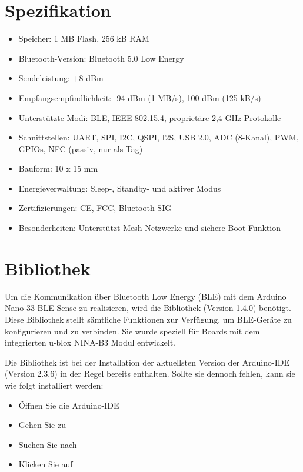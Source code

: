 \section{Spezifikation}
\begin{itemize}
	\item Speicher: 1 MB Flash, 256 kB RAM
	\item Bluetooth-Version: Bluetooth 5.0 Low Energy
	\item Sendeleistung: +8 dBm
	\item Empfangsempfindlichkeit: -94 dBm (1 MB/s), 100 dBm (125 kB/s)
	\item Unterstützte Modi: BLE, IEEE 802.15.4, proprietäre 2,4-GHz-Protokolle
	\item Schnittstellen: UART, SPI, I2C, QSPI, I2S, USB 2.0, ADC (8-Kanal), PWM, GPIOs, NFC (passiv, nur als Tag)
	\item Bauform: 10 x 15 mm 
	\item Energieverwaltung: Sleep-, Standby- und aktiver Modus
	\item Zertifizierungen: CE, FCC, Bluetooth SIG
	\item Besonderheiten: Unterstützt Mesh-Netzwerke und sichere Boot-Funktion
\end{itemize}
 \cite{UBLOX:2023}
 
\section{Bibliothek}
Um die Kommunikation über Bluetooth Low Energy (BLE) mit dem Arduino Nano 33 BLE Sense zu realisieren, wird die Bibliothek  (Version 1.4.0) benötigt. Diese Bibliothek stellt sämtliche Funktionen zur Verfügung, um BLE-Geräte zu konfigurieren und zu verbinden. Sie wurde speziell für Boards mit dem integrierten u-blox NINA-B3 Modul entwickelt.

Die Bibliothek ist bei der Installation der aktuellsten Version der Arduino-IDE (Version 2.3.6) in der Regel bereits enthalten. Sollte sie dennoch fehlen, kann sie wie folgt installiert werden:

\begin{itemize}
	\item Öffnen Sie die Arduino-IDE
	\item Gehen Sie zu 
	\item Suchen Sie nach 
	\item Klicken Sie auf 
\end{itemize}

